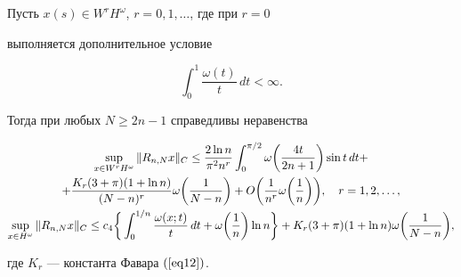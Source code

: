 \begin{thm}\label{th2}


Пусть $x(s)\in


W^rH^\omega$, $r=0,1,\dotsc$, где при $r=0$


выполняется дополнительное условие


\begin{equation}\label{eq22}


\int_0^1\frac{\omega(t)}{t}\,dt<\infty.


\end{equation}


Тогда при любых $N\geq2n-1$ справедливы неравенства


\begin{gather}


\sup_{x\in W^rH^\omega}\|R_{n,N}x\|_C \leq \frac{2\ln n}{\pi^2n^r}


\int_0^{\pi/2}\omega\bigg(\frac{4t}{2n+1}\bigg)\sin t \, dt+\notag \\


\label{eq23}


+\frac{K_r(3+\pi)(1+\ln n)}{(N-n)^r}\omega\bigg(\frac{1}{N-n}\bigg)+


O\bigg(\frac{1}{n^r}\omega\bigg(\frac{1}{n}\bigg)\bigg),\quad


r=1,2,\dotsc, \\


%


\label{eq24}


\sup_{x\in H^\omega}\|R_{n,N}x\|_C\leq


c_4\bigg\{\int_0^{1/n}\frac{\omega(x;t)}{t}\,


dt+\omega\bigg(\frac{1}{n}\bigg)\ln n\bigg\} +


K_r(3+\pi)(1+\ln n)


\omega\bigg(\frac{1}{N-n}\bigg),


\end{gather}


где $K_r$ --- константа Фавара $(\ref{eq12})$.


\end{thm}








